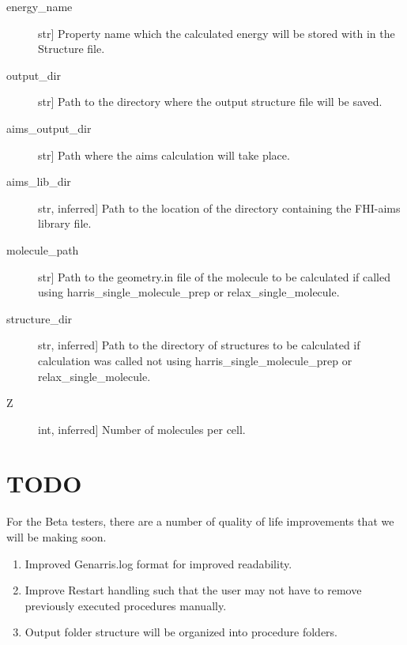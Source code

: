 \documentclass[letterpaper,10pt,english]{sphinxmanual}
\begin{document}
\begin{fulllineitems}
\begin{fulllineitems}
\begin{description}
\item[{energy\_name}] \leavevmode{[}str{]}
Property name which the calculated energy will be stored with in the
Structure file.

\item[{output\_dir}] \leavevmode{[}str{]}
Path to the directory where the output structure file will be saved.

\item[{aims\_output\_dir}] \leavevmode{[}str{]}
Path where the aims calculation will take place.

\item[{aims\_lib\_dir}] \leavevmode{[}str, inferred{]}
Path to the location of the directory containing the FHI-aims library
file.

\item[{molecule\_path}] \leavevmode{[}str{]}
Path to the geometry.in file of the molecule to be calculated if
called using harris\_single\_molecule\_prep or relax\_single\_molecule.

\item[{structure\_dir}] \leavevmode{[}str, inferred{]}
Path to the directory of structures to be calculated if calculation
was called not using harris\_single\_molecule\_prep or
relax\_single\_molecule.

\item[{Z}] \leavevmode{[}int, inferred{]}
Number of molecules per cell.

\end{description}

\end{fulllineitems}


\end{fulllineitems}



\chapter{TODO}
\label{\detokenize{index:todo}}
For the Beta testers, there are a number of quality of life improvements that
we will be making soon.
\begin{enumerate}
\def\theenumi{\arabic{enumi}}
\def\labelenumi{\theenumi .}
\makeatletter\def\p@enumii{\p@enumi \theenumi .}\makeatother
\item {} 
Improved Genarris.log format for improved readability.

\item {} 
Improve Restart handling such that the user may not have to remove previously
executed procedures manually.

\item {} 
Output folder structure will be organized into procedure folders.

\end{enumerate}



\renewcommand{\indexname}{Index}
\printindex
\end{document}
